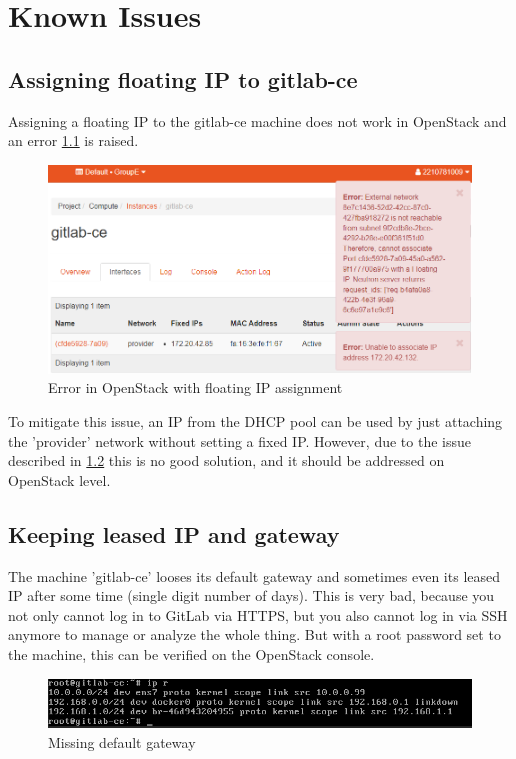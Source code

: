 \chapter{Known Issues}

\section{Assigning floating IP to gitlab-ce}

Assigning a floating IP to the gitlab-ce machine does not work in OpenStack and an error \ref{fig:floating_ip_error} is raised.

\begin{figure}[H]
	\centering
	\includegraphics[width=14cm]{images/floating_ip_error.png}
	\caption{Error in OpenStack with floating IP assignment}
	\label{fig:floating_ip_error}
\end{figure}

To mitigate this issue, an IP from the DHCP pool can be used by just attaching the 'provider' network without setting a fixed IP. However, due to the issue described in \ref{leased_ip_gateway} this is no good solution, and it should be addressed on OpenStack level.

\section{Keeping leased IP and gateway} \label{leased_ip_gateway}

The machine 'gitlab-ce' looses its default gateway and sometimes even its leased IP after some time (single digit number of days).
This is very bad, because you not only cannot log in to GitLab via HTTPS, but you also cannot log in via SSH anymore to manage or analyze the whole thing.
But with a root password set to the machine, this can be verified on the OpenStack console.

\begin{figure}[H]
	\centering
	\includegraphics[width=14cm]{images/missing_ip_gateway.png}
	\caption{Missing default gateway}
	\label{fig:missing_ip_gateway}
\end{figure}


